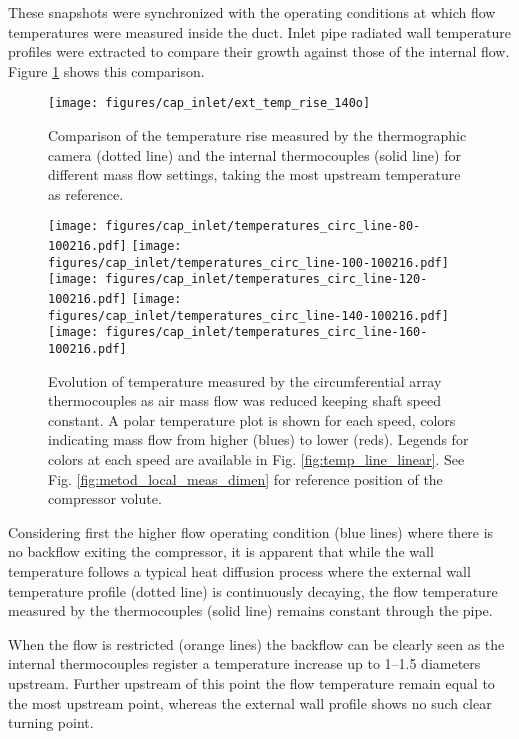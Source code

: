 These snapshots were synchronized with the operating conditions at which flow temperatures were measured inside the duct. Inlet pipe radiated wall temperature profiles were extracted to compare their growth against those of the internal flow. Figure \ref{fig:temp_ext_comp} shows this comparison. 

\begin{figure}[!t]
\centering
\texttt{[image: figures/cap\_inlet/ext\_temp\_rise\_140o]}
\caption{Comparison of the temperature rise measured by the thermographic camera (dotted line) and the internal thermocouples (solid line) for different mass flow settings, taking the most upstream temperature as reference.}
\label{fig:temp_ext_comp}
\end{figure}

\begin{figure}[t!]
\centering
\texttt{[image: figures/cap\_inlet/temperatures\_circ\_line-80-100216.pdf]}
\texttt{[image: figures/cap\_inlet/temperatures\_circ\_line-100-100216.pdf]}
\texttt{[image: figures/cap\_inlet/temperatures\_circ\_line-120-100216.pdf]}
\texttt{[image: figures/cap\_inlet/temperatures\_circ\_line-140-100216.pdf]}
\texttt{[image: figures/cap\_inlet/temperatures\_circ\_line-160-100216.pdf]}
\caption{Evolution of temperature measured by the circumferential array thermocouples as air mass flow was reduced keeping shaft speed constant. A polar temperature plot is shown for each speed, colors indicating mass flow from higher (blues) to lower (reds). Legends for colors at each speed are available in Fig. \ref{fig:temp_line_linear}. See Fig. \ref{fig:metod_local_meas_dimen} for reference position of the compressor volute.}
\label{fig:temp_circ_all}
\end{figure}

Considering first the higher flow operating condition (blue lines) where there is no backflow exiting the compressor, it is apparent that while the wall temperature follows a typical heat diffusion process where the external wall temperature profile (dotted line) is continuously decaying, the flow temperature measured by the thermocouples (solid line) remains constant through the pipe.

When the flow is restricted (orange lines) the backflow can be clearly seen as the internal thermocouples register a temperature increase up to 1--1.5 diameters upstream. Further upstream of this point the flow temperature remain equal to the most upstream point, whereas the external wall profile shows no such clear turning point.

